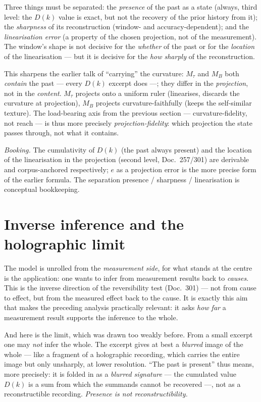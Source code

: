 Three things must be separated: the \emph{presence} of the past as a state (always, third level: the $D(k)$ value is
exact, but not the recovery of the prior history from it);
the \emph{sharpness} of its reconstruction (window- and accuracy-dependent); and the
\emph{linearisation error} (a property of the chosen projection, not of the measurement). The
window's shape is not decisive for the \emph{whether} of the past or for the \emph{location}
of the linearisation --- but it is decisive for the \emph{how sharply} of the reconstruction.

This sharpens the earlier talk of \enquote{carrying} the curvature: $M_\tau$ and $M_B$ both
\emph{contain} the past --- every $D(k)$ excerpt does ---; they differ in the
\emph{projection}, not in the \emph{content}. $M_\tau$ projects onto a uniform ruler
(linearises, discards the curvature at projection), $M_B$ projects curvature-faithfully (keeps
the self-similar texture). The load-bearing axis from the previous section --- curvature-fidelity,
not reach --- is thus more precisely \emph{projection-fidelity}: which projection the state
passes through, not what it contains.

\emph{Booking.} The cumulativity of $D(k)$ (the past always present) and the location of the
linearisation in the projection (second level, Doc.~257/301) are derivable and corpus-anchored
respectively; $e$ as a projection error is the more precise form of the earlier formula. The
separation presence / sharpness / linearisation is conceptual bookkeeping.

\section{Inverse inference and the holographic limit}

The model is unrolled from the \emph{measurement side}, for what stands at the centre is the
application: one wants to infer from measurement results back to \emph{causes}. This is the
inverse direction of the reversibility test (Doc.~301) --- not from cause to effect, but from
the measured effect back to the cause. It is exactly this aim that makes the preceding analysis
practically relevant: it asks \emph{how far} a measurement result supports the inference to the
whole.

And here is the limit, which was drawn too weakly before. From a small excerpt one may
\emph{not} infer the whole. The excerpt gives at best a \emph{blurred} image of the whole ---
like a fragment of a holographic recording, which carries the entire image but only unsharply,
at lower resolution. \enquote{The past is present} thus means, more precisely: it is folded in
as a \emph{blurred signature} --- the cumulated value $D(k)$ is a sum from which the summands
cannot be recovered ---, not as a reconstructible recording. \emph{Presence is not
reconstructibility.}

